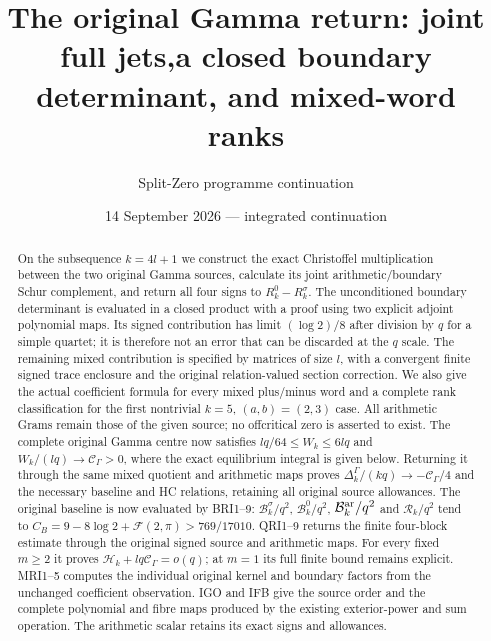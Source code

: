 \documentclass[11pt,a4paper]{article}
\title{The original Gamma return: joint full jets,\newline a closed boundary determinant, and mixed-word ranks}
\author{Split-Zero programme continuation}
\date{14 September 2026 --- integrated continuation}
\begin{document}
\maketitle
\begin{abstract}
On the subsequence $k=4l+1$ we construct the exact Christoffel multiplication between the two original Gamma sources, calculate its joint arithmetic/boundary Schur complement, and return all four signs to $R_k^0-R_k^\sigma$. The unconditioned boundary determinant is evaluated in a closed product with a proof using two explicit adjoint polynomial maps. Its signed contribution has limit $(\log 2)/8$ after division by $q$ for a simple quartet; it is therefore not an error that can be discarded at the $q$ scale. The remaining mixed contribution is specified by matrices of size $l$, with a convergent finite signed trace enclosure and the original relation-valued section correction. We also give the actual coefficient formula for every mixed plus/minus word and a complete rank classification for the first nontrivial $k=5$, $(a,b)=(2,3)$ case. All arithmetic Grams remain those of the given source; no offcritical zero is asserted to exist.
The complete original Gamma centre now satisfies
$lq/64\leq W_k\leq6lq$ and $W_k/(lq)\to\mathcal C_\Gamma>0$,
where the exact equilibrium integral is given below. Returning it
through the same mixed quotient and arithmetic maps proves
$\Delta_k^\Gamma/(kq)\to-\mathcal C_\Gamma/4$ and the necessary
baseline and HC relations, retaining all original source allowances.
The original baseline is now evaluated by BRI1--9:
$\mathcal B_k^\sigma/q^2$, $\mathcal B_k^0/q^2$,
$\mathcal B_k^{\rm ar}/q^2$ and $\mathcal R_k/q^2$ tend to
$C_B=9-8\log2+\mathcal F(2,\pi)>769/17010$.
QRI1--9 returns the finite four-block estimate through the original
signed source and arithmetic maps. For every fixed $m\ge2$ it proves
$\mathcal H_k+lq\mathcal C_\Gamma=o(q)$; at $m=1$ its full finite
bound remains explicit. MRI1--5 computes the individual original
kernel and boundary factors from the unchanged coefficient observation.
IGO and IFB give the source order and the complete polynomial and
fibre maps produced by the existing exterior-power and sum operation.
The arithmetic scalar retains its exact signs and allowances.
\end{abstract}
\end{document}
